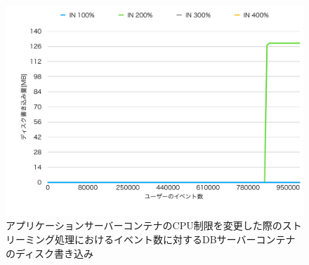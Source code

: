 \documentclass[../../../../../main]{subfiles}
\begin{document}
    \begin{figure}[H]
        \centering
        \includegraphics[width=12cm]{graph}
        \caption{アプリケーションサーバーコンテナのCPU制限を変更した際のストリーミング処理におけるイベント数に対するDBサーバーコンテナのディスク書き込み}
        \label{fig:stream-change-app-cpu-limit-db-disk-in-app_1024-db_1_1024}
    \end{figure}
\end{document}
